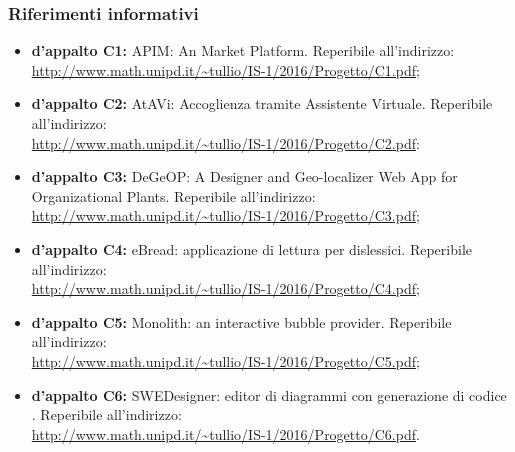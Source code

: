 \subsubsection{Riferimenti informativi}
\begin{itemize}

	\item \textbf{ d'appalto C1:} APIM: An  Market Platform. Reperibile all'indirizzo:\\ \url{http://www.math.unipd.it/~tullio/IS-1/2016/Progetto/C1.pdf};

	\item \textbf{ d'appalto C2:} AtAVi: Accoglienza tramite Assistente Virtuale. Reperibile all'indirizzo:\\ \url{http://www.math.unipd.it/~tullio/IS-1/2016/Progetto/C2.pdf}:

	\item \textbf{ d'appalto C3:} DeGeOP: A Designer and Geo-localizer Web App for Organizational Plants. Reperibile all'indirizzo:\\ \url{http://www.math.unipd.it/~tullio/IS-1/2016/Progetto/C3.pdf};

	\item \textbf{ d'appalto C4:} eBread: applicazione di lettura per dislessici. Reperibile all'indirizzo:\\ \url{http://www.math.unipd.it/~tullio/IS-1/2016/Progetto/C4.pdf};

	\item \textbf{ d'appalto C5:} Monolith: an interactive bubble provider. Reperibile all'indirizzo:\\ \url{http://www.math.unipd.it/~tullio/IS-1/2016/Progetto/C5.pdf};

	\item \textbf{ d'appalto C6:} SWEDesigner: editor di diagrammi  con generazione di codice . Reperibile all'indirizzo:\\ \url{http://www.math.unipd.it/~tullio/IS-1/2016/Progetto/C6.pdf}.

\end{itemize}
